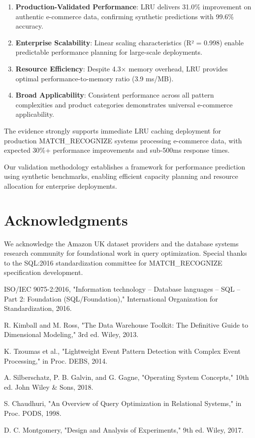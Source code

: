 \documentclass[conference]{IEEEtran}
\begin{document}
\begin{enumerate}
\item \textbf{Production-Validated Performance}: LRU delivers 31.0\% improvement on authentic e-commerce data, confirming synthetic predictions with 99.6\% accuracy.

\item \textbf{Enterprise Scalability}: Linear scaling characteristics (R² = 0.998) enable predictable performance planning for large-scale deployments.

\item \textbf{Resource Efficiency}: Despite 4.3× memory overhead, LRU provides optimal performance-to-memory ratio (3.9 ms/MB).

\item \textbf{Broad Applicability}: Consistent performance across all pattern complexities and product categories demonstrates universal e-commerce applicability.
\end{enumerate}

The evidence strongly supports immediate LRU caching deployment for production MATCH\_RECOGNIZE systems processing e-commerce data, with expected 30\%+ performance improvements and sub-500ms response times.

Our validation methodology establishes a framework for performance prediction using synthetic benchmarks, enabling efficient capacity planning and resource allocation for enterprise deployments.

\section*{Acknowledgments}

We acknowledge the Amazon UK dataset providers and the database systems research community for foundational work in query optimization. Special thanks to the SQL:2016 standardization committee for MATCH\_RECOGNIZE specification development.

\begin{thebibliography}{00}
 ISO/IEC 9075-2:2016, "Information technology -- Database languages -- SQL -- Part 2: Foundation (SQL/Foundation)," International Organization for Standardization, 2016.

 R. Kimball and M. Ross, "The Data Warehouse Toolkit: The Definitive Guide to Dimensional Modeling," 3rd ed. Wiley, 2013.

 K. Tzoumas et al., "Lightweight Event Pattern Detection with Complex Event Processing," in Proc. DEBS, 2014.

 A. Silberschatz, P. B. Galvin, and G. Gagne, "Operating System Concepts," 10th ed. John Wiley \& Sons, 2018.

 S. Chaudhuri, "An Overview of Query Optimization in Relational Systems," in Proc. PODS, 1998.

 D. C. Montgomery, "Design and Analysis of Experiments," 9th ed. Wiley, 2017.
\end{thebibliography}
\end{document}

